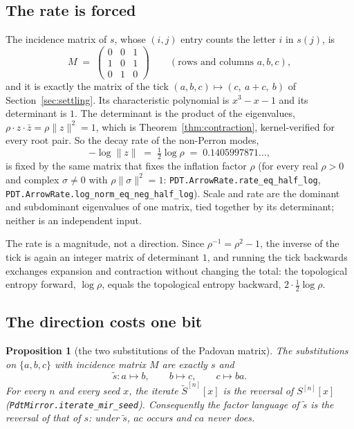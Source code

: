 \documentclass[11pt]{amsart}
\theoremstyle{plain}
\newtheorem{proposition}[theorem]{Proposition}
\theoremstyle{definition}
\theoremstyle{remark}
\begin{document}
\subsection{The rate is forced}

The incidence matrix of $s$, whose $(i,j)$ entry counts the letter $i$ in $s(j)$, is
\[
  M \;=\; \begin{pmatrix} 0 & 0 & 1 \\ 1 & 0 & 1 \\ 0 & 1 & 0 \end{pmatrix}
  \qquad (\text{rows and columns } a, b, c),
\]
and it is exactly the matrix of the tick $(a, b, c) \mapsto (c,\ a + c,\ b)$ of
Section~\ref{sec:settling}. Its characteristic polynomial is $x^3 - x - 1$ and its
determinant is $1$. The determinant is the product of the eigenvalues,
$\rho \cdot z \cdot \bar z = \rho \lVert z \rVert^2 = 1$, which is
Theorem~\ref{thm:contraction}, kernel-verified for every root pair. So the decay rate of the
non-Perron modes,
\[
  -\log \lVert z \rVert \;=\; \tfrac12 \log \rho \;=\; 0.1405997871\ldots,
\]
is fixed by the same matrix that fixes the inflation factor $\rho$
(for every real $\rho > 0$ and complex $\sigma \ne 0$ with $\rho \lVert \sigma \rVert^2 = 1$:
\texttt{PDT.ArrowRate.rate\_eq\_half\_log}, \texttt{PDT.ArrowRate.log\_norm\_eq\_neg\_half\_log}). Scale and rate are the dominant and
subdominant eigenvalues of one matrix, tied together by its determinant; neither is an
independent input.

The rate is a magnitude, not a direction. Since $\rho^{-1} = \rho^2 - 1$, the inverse of the
tick is again an integer matrix of determinant $1$, and running the tick backwards exchanges
expansion and contraction without changing the total: the topological entropy forward,
$\log \rho$, equals the topological entropy backward, $2 \cdot \tfrac12 \log \rho$.

\subsection{The direction costs one bit}

\begin{proposition}[the two substitutions of the Padovan matrix]\label{prop:twosubs}
The substitutions on $\{a, b, c\}$ with incidence matrix $M$ are exactly $s$ and
\[
  \tilde s \colon a \mapsto b, \qquad b \mapsto c, \qquad c \mapsto ba .
\]
For every $n$ and every seed $x$, the iterate $\tilde S^{[n]}[x]$ is the reversal of
$S^{[n]}[x]$ \textup{(\texttt{PdtMirror.iterate\_mir\_seed})}. Consequently the factor
language of $\tilde s$ is the reversal of that of $s$: under $\tilde s$, $ac$ occurs and $ca$
never does.
\end{proposition}
\end{document}
